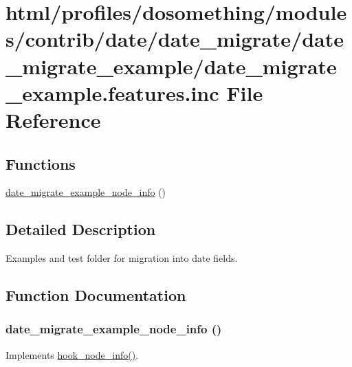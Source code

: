 \hypertarget{date__migrate__example_8features_8inc}{
\section{html/profiles/dosomething/modules/contrib/date/date\_\-migrate/date\_\-migrate\_\-example/date\_\-migrate\_\-example.features.inc File Reference}
\label{date__migrate__example_8features_8inc}
}
\subsection*{Functions}
\begin{DoxyCompactItemize}
\item 
\hyperlink{date__migrate__example_8features_8inc_a5278c32f9e1c00148820637a12202bd5}{date\_\-migrate\_\-example\_\-node\_\-info} ()
\end{DoxyCompactItemize}


\subsection{Detailed Description}
Examples and test folder for migration into date fields. 

\subsection{Function Documentation}
\hypertarget{date__migrate__example_8features_8inc_a5278c32f9e1c00148820637a12202bd5}{
\subsubsection[{date\_\-migrate\_\-example\_\-node\_\-info}]{\setlength{\rightskip}{0pt plus 5cm}date\_\-migrate\_\-example\_\-node\_\-info ()}}
\label{date__migrate__example_8features_8inc_a5278c32f9e1c00148820637a12202bd5}
Implements \hyperlink{group__node__api__hooks_ga3b6ad51d7815d1cdd093b0e0f350cbd0}{hook\_\-node\_\-info()}. 